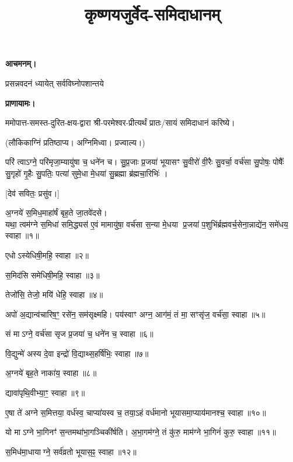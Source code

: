 \setmainfont[Script=Devanagari,Mapping=tex-text,Mapping=devanagarinumerals,AutoFakeBold=2.0]{Siddhanta}
\title{\Huge कृष्णयजुर्वेद-समिदाधानम्}
\date{}
\maketitle
{}

\textbf{आचमनम्।}

{प्रसन्नवदनं ध्यायेत् सर्वविघ्नोपशान्तये}
 
\textbf{प्राणायामः।} 

ममोपात्त-समस्त-दुरित-क्षय-द्वारा श्री-परमेश्वर-प्रीत्यर्थं प्रातः/सायं समिदाधानं करिष्ये।

(लौकिकाग्निं प्रतिष्ठाप्य। अग्निमिध्वा। प्रज्वाल्य।)

परि॑ त्वाऽग्ने॒ परि॑मृजा॒म्यायु॑षा च॒ धने॑न च। सु॒प्र॒जाः प्र॒जया॑ भूयासꣳ सु॒वीरो॑ वी॒रैः सु॒वर्चा॒ वर्च॑सा सु॒पोषः॒ पोषैः᳚ सु॒गृहो॑ गृ॒हैः सु॒पतिः॒ पत्या॑ सुमे॒धा मे॒धया॑ सु॒ब्रह्मा ब्र॑ह्मचा॒रिभिः॑ ।

[देव॑ सवितः॒ प्रसु॑व।]

अ॒ग्नये॑ स॒मिध॒माहा॑र्\mbox{}षं बृह॒ते जा॒तवे॑दसे।\\
यथा॒ त्वम॑ग्ने स॒मिधा॑ समि॒द्ध्यस॑ ए॒वं मामायु॑षा॒ वर्च॑सा स॒न्या मे॒धया प्र॒जया॑ प॒शुभि॑र्ब्रह्मवर्च॒सेना॒न्नाद्ये॑न॒ समे॑धय॒ स्वाहा॥१॥

एधोऽस्येधिषी॒महि॒ स्वाहा॥२॥

स॒मिद॑सि समेधिषी॒महि॒ स्वाहा॥३॥

तेजो॑सि॒ तेजो॒ मयि॑ धेहि॒ स्वाहा॥४॥

अपो॑ अ॒द्यान्व॑चारिष॒ꣳ॒ रसे॑न॒ सम॑सृक्ष्महि। पय॑स्वाꣳ अग्न॒ आग॑मं॒ तं मा॒ सꣳसृ॑ज॒ वर्च॑सा॒ स्वाहा॥५॥

सं माऽग्ने॒ वर्च॑सा सृज प्र॒जया॑ च॒ धने॑न च॒ स्वाहा॥६॥

वि॒द्युन्मे॑ अस्य दे॒वा इन्द्रो॑ वि॒द्याथ्स॒हर्\mbox{}षि॑भिः॒ स्वाहा॥७॥

अ॒ग्नये॑ बृह॒ते नाका॑य॒ स्वाहा॥८॥

द्यावा॑पृथि॒वीभ्या॒ꣳ॒ स्वाहा॥९॥

ए॒षा ते॑ अग्ने स॒मित्तया॒ वर्ध॑स्व॒ चाप्या॑यस्व च॒ तया॒ऽहं वर्ध॑मानो भूयासमा॒प्याय॑मानश्च॒ स्वाहा॥१०॥

यो माऽग्ने भा॒गिनꣳ॑ स॒न्तमथा॑भा॒गञ्चिकी॑र्\mbox{}षति। अ॒भा॒गम॑ग्ने॒ तं कु॑रु॒ माम॑ग्ने भा॒गिनं॑ कुरु॒ स्वाहा॥११॥

स॒मिध॑मा॒धायाग्ने॒ सर्व॑व्रतो भूयास॒ꣴ॒ स्वाहा॥१२॥

